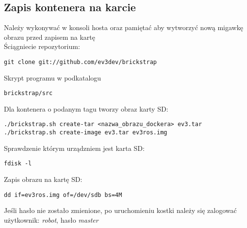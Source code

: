 \documentclass{article}
\begin{document}
\subsection{Zapis kontenera na karcie}
Należy wykonywać w konsoli hosta oraz pamiętać aby wytworzyć nową migawkę obrazu przed zapisem na kartę\\
Ściągniecie repozytorium:
\begin{lstlisting}
git clone git://github.com/ev3dev/brickstrap
\end{lstlisting}
Skrypt programu w podkatalogu
\begin{lstlisting}
brickstrap/src
\end{lstlisting}
Dla kontenera o podanym tagu tworzy obraz karty SD\cite{brickstrap}:
\begin{lstlisting}
./brickstrap.sh create-tar <nazwa_obrazu_dockera> ev3.tar
./brickstrap.sh create-image ev3.tar ev3ros.img
\end{lstlisting}
Sprawdzenie którym urządzniem jest karta SD:
\begin{lstlisting}
fdisk -l
\end{lstlisting}
Zapis obrazu na kartę SD:
\begin{lstlisting}
dd if=ev3ros.img of=/dev/sdb bs=4M
\end{lstlisting}
Jeśli hasło nie zostało zmienione, po uruchomieniu kostki należy się zalogować użytkownik: \textit{robot}, hasło \textit{master}



\end{document}
